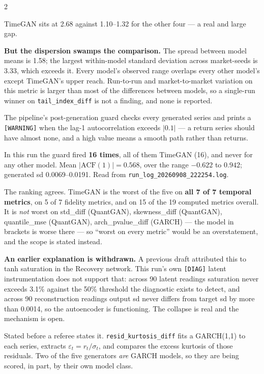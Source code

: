 \documentclass[10pt]{article}
\newcommand{\redbox}[2]{\begin{tcolorbox}[mybox={DRed}{RBg},title={#1}]#2\end{tcolorbox}}
\newcommand{\indigobox}[2]{\begin{tcolorbox}[mybox={Indigo}{IBg},title={#1}]#2\end{tcolorbox}}
\begin{document}
\begin{multicols}{2}
{\smallskip
TimeGAN sits at 2.68 against 1.10--1.32 for the other four --- a real and large gap.

\smallskip
\textbf{But the dispersion swamps the comparison.} The spread between model means is 1.58; the largest within-model standard deviation across market-seeds is 3.33, which exceeds it. Every model's observed range overlaps every other model's except TimeGAN's upper reach. Run-to-run and market-to-market variation on this metric is larger than most of the differences between models, so a single-run winner on \texttt{tail\_index\_diff} is not a finding, and none is reported.}

\redbox{TimeGAN: Mode Collapse, Caught by the Guard}{%
The pipeline's post-generation guard checks every generated series and prints a \texttt{[WARNING]} when the lag-1 autocorrelation exceeds $|0.1|$ --- a return series should have almost none, and a high value means a smooth path rather than returns.

\smallskip
In this run the guard fired \textbf{16 times}, all of them TimeGAN (16), and never for any other model. Mean \(|\text{ACF}(1)| = 0.568\), over the range \(-0.622\) to \(0.942\); generated sd 0.0069--0.0191. Read from \texttt{run\_log\_20260908\_222254.log}.

\smallskip
The ranking agrees. TimeGAN is the worst of the five on \textbf{all 7 of 7 temporal metrics}, on 5 of 7 fidelity metrics, and on 15 of the 19 computed metrics overall. It is \emph{not} worst on std\_diff (QuantGAN), skewness\_diff (QuantGAN), quantile\_mse (QuantGAN), arch\_pvalue\_diff (GARCH) --- the model in brackets is worse there --- so ``worst on every metric'' would be an overstatement, and the scope is stated instead.

\smallskip
\textbf{An earlier explanation is withdrawn.} A previous draft attributed this to tanh saturation in the Recovery network. This run's own \texttt{[DIAG]} latent instrumentation does not support that: across 90 latent readings saturation never exceeds 3.1\% against the 50\% threshold the diagnostic exists to detect, and across 90 reconstruction readings output sd never differs from target sd by more than 0.0014, so the autoencoder is functioning. The collapse is real and the mechanism is open.}

\indigobox{Metric Circularity: \texttt{resid\_kurtosis\_diff}}{%
Stated before a referee states it. \texttt{resid\_kurtosis\_diff} fits a GARCH(1,1) to each series, extracts $\varepsilon_t = r_t/\sigma_t$, and compares the excess kurtosis of those residuals. Two of the five generators \emph{are} GARCH models, so they are being scored, in part, by their own model class.

}
\end{multicols}
\end{document}
